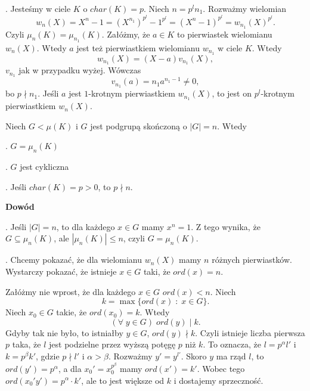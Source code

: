 
. Jesteśmy w ciele $K$ o $char(K)=p$. Niech $n=p^ln_1$. Rozważmy wielomian
$$w_n(X)=X^n-1=(X^{n_1})^{p^l}-1^{p^l}=(X^n-1)^{p^l}=w_{n_1}(X)^{p^l}.$$
Czyli $\mu_n(K)=\mu_{n_1}(K)$. Załóżmy, że $a\in K$ to pierwiastek wielomianu $w_n(X)$. Wtedy $a$ jest też pierwiastkiem wielomianu $w_{n_1}$ w ciele $K$. Wtedy
$$w_{n_1}(X)=(X-a)v_{n_1}(X),$$
$v_{n_1}$ jak w przypadku wyżej. Wówczas
$$v_{n_1}(a)=n_1a^{n_1-1}\neq0,$$
bo $p\nmid n_1$. 
Jeśli $a$ jest $1$-krotnym pierwiastkiem $w_{n_1}(X)$, to jest on $p^l$-krotnym pierwiastkiem $w_n(X)$.



\begin{tw}
    Niech $G<\mu(K)$ i $G$ jest podgrupą skończoną o $|G|=n$. Wtedy

. $G=\mu_n(K)$

. $G$ jest cykliczna

. Jeśli $char(K)=p>0$, to $p\nmid n$.
\end{tw}

\textbf{Dowód}

. Jeśli $|G|=n$, to dla każdego $x\in G$ mamy $x^n=1$. Z tego wynika, że $G\subseteq \mu_n(K)$, ale $|\mu_n(K)|\leq n$, czyli $G=\mu_n(K)$.

. Chcemy pokazać, że dla wielomianu $w_n(X)$ mamy $n$ różnych pierwiastków. Wystarczy pokazać, że istnieje $x\in G$ taki, że $ord(x)=n$.

Załóżmy nie wprost, że dla każdego $x\in G$ $ord(x)<n$. Niech 
$$k=\max\{ord(x)\;:\;x\in G\}.$$ 
Niech $x_0\in G$ takie, że $ord(x_0)=k$. Wtedy 
$$(\forall\;y\in G)\;ord(y)\;|\;k.$$ 
Gdyby tak nie było, to istniałby $y\in G$, $ord(y)\nmid k$. Czyli istnieje liczba pierwsza $p$ taka, że $l$ jest podzielne przez wyższą potęgę $p$ niż $k$. To oznacza, że $l=p^{\alpha}l'$ i $k=p^\beta k'$, gdzie $p\nmid l'$ i $\alpha>\beta$. Rozważmy $y'=y^{l'}$. Skoro $y$ ma rząd $l$, to $ord(y')=p^\alpha$, a dla $x_0'=x_0^{p^\beta}$ mamy $ord(x')=k'$. Wobec tego $ord(x_0'y')=p^\alpha\cdot k'$, ale to jest większe od $k$ i dostajemy sprzeczność.


